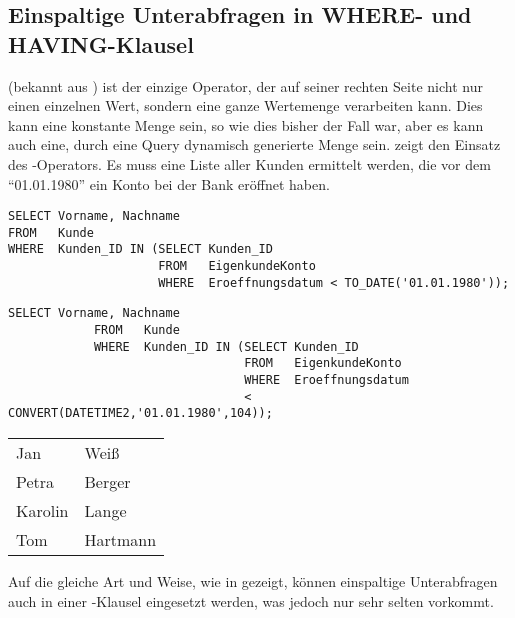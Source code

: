 \subsection{Einspaltige Unterabfragen in WHERE- und HAVING-Klausel}
 (bekannt aus ) ist der einzige Operator, der auf seiner rechten Seite nicht nur einen einzelnen Wert, sondern eine ganze Wertemenge verarbeiten kann. Dies kann eine konstante Menge sein, so wie dies bisher der Fall war, aber es kann auch eine, durch eine Query dynamisch generierte Menge sein.  zeigt den Einsatz des -Operators. Es muss eine Liste aller Kunden ermittelt werden, die vor dem \enquote{01.01.1980} ein Konto bei der Bank eröffnet haben.
\begin{lstlisting}[language=oracle_sql,caption={\languageorasql{IN} mit Unterabfrage},label=sql06_07]
SELECT Vorname, Nachname
FROM   Kunde
WHERE  Kunden_ID IN (SELECT Kunden_ID
                     FROM   EigenkundeKonto
                     WHERE  Eroeffnungsdatum < TO_DATE('01.01.1980'));
        \end{lstlisting}
        \begin{lstlisting}[language=ms_sql,caption={Die Fehlermeldung in SQL Server},label=sql05_04]
            SELECT Vorname, Nachname
            FROM   Kunde
            WHERE  Kunden_ID IN (SELECT Kunden_ID
                                 FROM   EigenkundeKonto
                                 WHERE  Eroeffnungsdatum 
                                 < CONVERT(DATETIME2,'01.01.1980',104));
        \end{lstlisting} 
\begin{center}
    \begin{small}
        \tablehead{}
        \begin{msoraclesql}
            \begin{supertabular}{ll}
                Jan & Weiß \\
                Petra & Berger \\
                Karolin & Lange \\
                Tom & Hartmann \\
            \end{supertabular}
        \end{msoraclesql}
    \end{small}
\end{center}
Auf die gleiche Art und Weise, wie in  gezeigt, können einspaltige Unterabfragen auch in einer \HAVING-Klausel eingesetzt werden, was jedoch nur sehr selten vorkommt.
